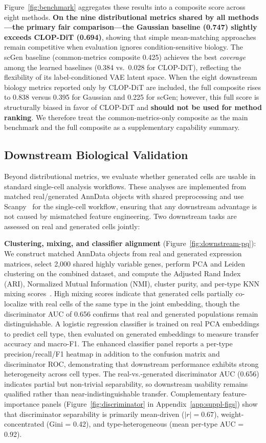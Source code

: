 \documentclass[11pt,a4paper]{article}
\begin{document}
Figure~\ref{fig:benchmark} aggregates these results into a composite score across eight methods. \textbf{On the nine distributional metrics shared by all methods---the primary fair comparison---the Gaussian baseline (0.747) slightly exceeds CLOP-DiT (0.694)}, showing that simple mean-matching approaches remain competitive when evaluation ignores condition-sensitive biology. The scGen baseline (common-metrics composite 0.425) achieves the best \emph{coverage} among the learned baselines (0.384 vs.\ 0.028 for CLOP-DiT), reflecting the flexibility of its label-conditioned VAE latent space. When the eight downstream biology metrics reported only by CLOP-DiT are included, the full composite rises to 0.838 versus 0.395 for Gaussian and 0.225 for scGen; however, this full score is structurally biased in favor of CLOP-DiT and \textbf{should not be used for method ranking}. We therefore treat the common-metrics-only composite as the main benchmark and the full composite as a supplementary capability summary.

\subsection{Downstream Biological Validation}

Beyond distributional metrics, we evaluate whether generated cells are usable in standard single-cell analysis workflows. These analyses are implemented from matched real/generated AnnData objects with shared preprocessing and use Scanpy~\cite{ref-scanpy} for the single-cell workflow, ensuring that any downstream advantage is not caused by mismatched feature engineering. Two downstream tasks are assessed on real and generated cells jointly:

\textbf{Clustering, mixing, and classifier alignment} (Figure~\ref{fig:downstream-pq}): We construct matched AnnData objects from real and generated expression matrices, select 2,000 shared highly variable genes, perform PCA and Leiden~\cite{ref-leiden} clustering on the combined dataset, and compute the Adjusted Rand Index (ARI), Normalized Mutual Information (NMI), cluster purity, and per-type KNN mixing scores~\cite{ref-integration-benchmark}. High mixing scores indicate that generated cells partially co-localize with real cells of the same type in the joint embedding, though the discriminator AUC of 0.656 confirms that real and generated populations remain distinguishable. A logistic regression classifier is trained on real PCA embeddings to predict cell type, then evaluated on generated embeddings to measure transfer accuracy and macro-F1. The enhanced classifier panel reports a per-type precision/recall/F1 heatmap in addition to the confusion matrix and discriminator ROC, demonstrating that downstream performance exhibits strong heterogeneity across cell types. The real-vs.-generated discriminator AUC (0.656) indicates partial but non-trivial separability, so downstream usability remains qualified rather than near-indistinguishable transfer. Complementary feature-importance panels (Figure~\ref{fig:discriminator} in Appendix~\ref{app:suppl-figs}) show that discriminator separability is primarily mean-driven ($|r| = 0.67$), weight-concentrated (Gini = 0.42), and type-heterogeneous (mean per-type AUC = 0.92).
\end{document}
